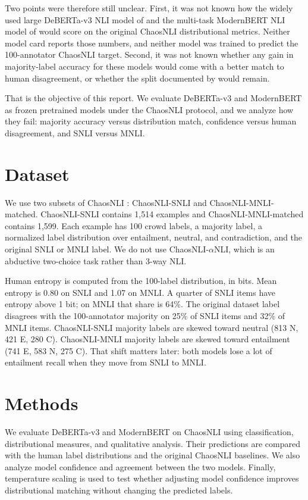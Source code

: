 \documentclass[11pt,a4paper]{article}
\begin{document}
Two points were therefore still unclear. First, it was not known how the widely used large DeBERTa-v3 NLI model of \citet{laurer2024less} and the multi-task ModernBERT NLI model of \citet{sileo2024tasksource} would score on the original ChaosNLI distributional metrics. Neither model card reports those numbers, and neither model was trained to predict the 100-annotator ChaosNLI target. Second, it was not known whether any gain in majority-label accuracy for these models would come with a better match to human disagreement, or whether the split documented by \citet{nie2020chaosnli} would remain.

That is the objective of this report. We evaluate DeBERTa-v3 and ModernBERT as frozen pretrained models under the ChaosNLI protocol, and we analyze how they fail: majority accuracy versus distribution match, confidence versus human disagreement, and SNLI versus MNLI.

\section{Dataset}

We use two subsets of ChaosNLI \citep{nie2020chaosnli}: ChaosNLI-SNLI and ChaosNLI-MNLI-matched. ChaosNLI-SNLI contains 1,514 examples and ChaosNLI-MNLI-matched contains 1,599. Each example has 100 crowd labels, a majority label, a normalized label distribution over entailment, neutral, and contradiction, and the original SNLI or MNLI label. We do not use ChaosNLI-$\alpha$NLI, which is an abductive two-choice task rather than 3-way NLI.

Human entropy is computed from the 100-label distribution, in bits. Mean entropy is 0.80 on SNLI and 1.07 on MNLI. A quarter of SNLI items have entropy above 1 bit; on MNLI that share is 64\%. The original dataset label disagrees with the 100-annotator majority on 25\% of SNLI items and 32\% of MNLI items. ChaosNLI-SNLI majority labels are skewed toward neutral (813 N, 421 E, 280 C). ChaosNLI-MNLI majority labels are skewed toward entailment (741 E, 583 N, 275 C). That shift matters later: both models lose a lot of entailment recall when they move from SNLI to MNLI.

\section{Methods}

We evaluate DeBERTa-v3 and ModernBERT on ChaosNLI using classification, distributional measures, and qualitative analysis. Their predictions are compared with the human label distributions and the original ChaosNLI baselines. We also analyze model confidence and agreement between the two models. Finally, temperature scaling is used to test whether adjusting model confidence improves distributional matching without changing the predicted labels.
\end{document}
